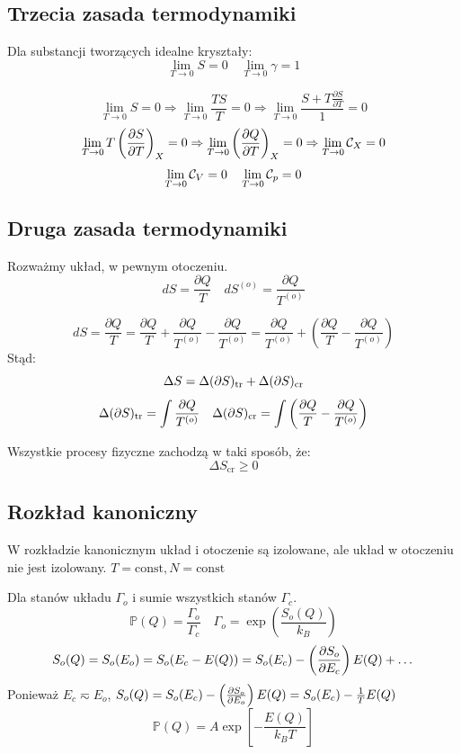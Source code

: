 \documentclass{../notatki}
\begin{document}
\subsection{Trzecia zasada termodynamiki}

Dla substancji tworzących idealne kryształy:
$$
\lim_{T \to 0} S = 0 \quad \lim_{T \to 0} \gamma = 1
$$

\begin{examplebox}
  $$
  \lim_{T \to 0} S = 0 \Rightarrow \lim_{T \to 0} \frac{TS}{T} = 0
  \Rightarrow \lim_{T \to 0} \frac{S + T \frac{\partial S}{\partial T}}{1} = 0
  $$
  $$
  \lim_{T \to 0} T \left(\frac{\partial S}{\partial T}\right)_X = 0 \Rightarrow \lim_{T \to 0}
  \left(\frac{\partial Q}{\partial T}\right)_X = 0 \Rightarrow \lim_{T \to 0} \mathcal{C}_X = 0
  $$
  $$
  \lim_{T \to 0} \mathcal{C}_V = 0 \quad \lim_{T \to 0} \mathcal{C}_p = 0
  $$
\end{examplebox}

\subsection{Druga zasada termodynamiki}

Rozważmy układ, w pewnym otoczeniu.
$$
dS = \frac{\partial Q}{T} \quad dS^{(o)} = \frac{\partial Q}{T^{(o)}}
$$

$$
dS = \frac{\partial Q}{T} = \frac{\partial Q}{T} + \frac{\partial
Q}{T^{(o)}} - \frac{\partial Q}{T^{(o)}}
= \frac{\partial Q}{T^{(o)}} + \left(\frac{\partial Q}{T} -
\frac{\partial Q}{T^{(o)}}\right)
$$
Stąd:
$$
\Delta S = \Delta (\partial S)_{\tr} + \Delta (\partial S)_{\textrm{cr}}
$$
$$
\Delta (\partial S)_{\tr} = \int \frac{\partial Q}{T^{(o)}} \quad
\Delta (\partial S)_{\textrm{cr}} = \int \left(\frac{\partial Q}{T} -
\frac{\partial Q}{T^{(o)}}\right)
$$

Wszystkie procesy fizyczne zachodzą w taki sposób, że:
$$
\Delta S_{\textrm{cr}} \geq 0
$$

\subsection{Rozkład kanoniczny}

W rozkładzie kanonicznym układ i otoczenie są izolowane, ale układ w otoczeniu
nie jest izolowany. $T = \textrm{const}, N = \textrm{const}$

Dla stanów układu $\Gamma_o$ i sumie wszystkich stanów $\Gamma_c$.
$$
\mathbb{P}(Q) = \frac{\Gamma_o}{\Gamma_c} \quad \Gamma_o =
\exp\left(\frac{S_o(Q)}{k_B}\right)
$$
$$
S_o(Q) = S_o(E_o) = S_o(E_c - E(Q)) = S_o(E_c) - \left(\frac{\partial S_o}{\partial E_c}\right) E(Q) + \dots
$$
Ponieważ $E_c \eqsim E_o$, $S_o(Q) = S_o(E_c) - \left(\frac{\partial S_o}{\partial E_o}\right)E(Q)
= S_o(E_c) - \frac{1}{T}E(Q)$
$$
\mathbb{P}(Q) = A \exp\left[-\frac{E(Q)}{k_BT}\right]
$$
\end{document}
